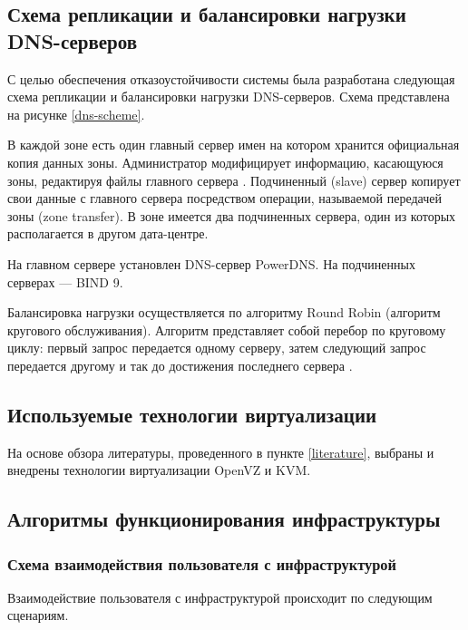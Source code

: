 \subsection{Схема репликации и балансировки нагрузки DNS-серверов}

С целью обеспечения отказоустойчивости системы была разработана следующая схема репликации и балансировки нагрузки DNS-серверов.
Схема представлена на рисунке \ref{dns-scheme}.

В каждой зоне есть один главный сервер имен на котором хранится официальная копия данных зоны.
Администратор модифицирует информацию, касающуюся зоны, редактируя файлы главного сервера \cite{unix-handbook}.
Подчиненный (slave) сервер копирует свои данные с главного сервера посредством операции, называемой передачей зоны (zone transfer).
В зоне имеется два подчиненных сервера, один из которых располагается в другом дата-центре.

На главном сервере установлен DNS-сервер PowerDNS.
На подчиненных серверах --- BIND 9.

Балансировка нагрузки осуществляется по алгоритму Round Robin (алгоритм кругового обслуживания).
Алгоритм представляет собой перебор по круговому циклу: первый запрос передается одному серверу, затем следующий запрос передается другому и так до достижения последнего сервера \cite{selectel}.

\subsection{Используемые технологии виртуализации}

На основе обзора литературы, проведенного в пункте \ref{literature}, выбраны и внедрены технологии виртуализации OpenVZ и KVM.

\subsection{Алгоритмы функционирования инфраструктуры}

\subsubsection{Схема взаимодействия пользователя с инфраструктурой}

Взаимодействие пользователя с инфраструктурой происходит по следующим сценариям.

